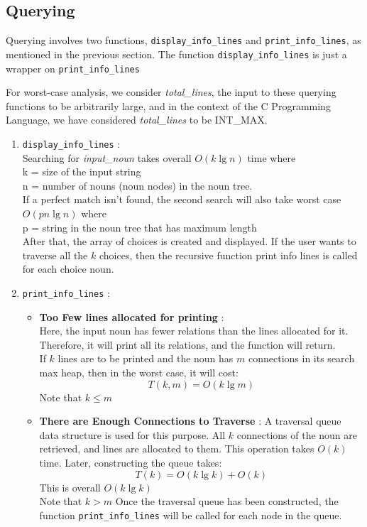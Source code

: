 \documentclass[conference]{IEEEtran}
\begin{document}
\subsection{Querying}
Querying involves two functions, \texttt{display\_info\_lines} and
\texttt{print\_info\_lines}, as mentioned in the previous section.
The function \texttt{display\_info\_lines} is just a wrapper on
\texttt{print\_info\_lines}

For worst-case analysis, we consider \textit{total\_lines}, the input to these querying functions to be arbitrarily large, and in the context of the C Programming Language, we have considered \textit{total\_lines} to be INT\_MAX.

\begin{enumerate}
    \item \texttt{display\_info\_lines} :
    \\Searching for \textit{input\_noun} takes overall $O(k \lg n)$  time where 
    \\k = size of the input string
    \\n = number of nouns (noun nodes) in the noun tree.
    \\If a perfect match isn’t found, the second search will also
take worst case  $O(pn \lg n)$ where
    \\p = string in the noun tree that has maximum length
    \\After that, the array of choices is created and displayed. If
the user wants to traverse all the $k$ choices, then the recursive
function print info lines is called for each choice noun.
    \item \texttt{print\_info\_lines} :
    \begin{itemize}
        \item \textbf{Too Few lines allocated for printing} :
        \\Here, the input noun has fewer relations than the lines
allocated for it. Therefore, it will print all its relations,
and the function will return. 
\\If $k$ lines are to be printed
and the noun has $m$ connections in its search max heap,
then in the worst case, it will cost:
\begin{equation}
	T(k, m) = O(k\lg m)
\end{equation}
Note that $k \leq m$
\item \textbf{There are Enough Connections to Traverse} : 
A traversal queue data structure is used for this purpose.
All $k$ connections of the noun are retrieved, and lines are
allocated to them. This operation takes $O(k)$ time. Later,
constructing the queue takes:
\begin{equation}
    T(k) = O(k\lg k) + O(k)
\end{equation}
This is overall $O(k\lg k)$
\\Note that $k > m$
Once the traversal queue has been constructed, the function \texttt{print\_info\_lines} will be called for each node
in the queue.


\end{itemize}
\end{enumerate}
\end{document}
